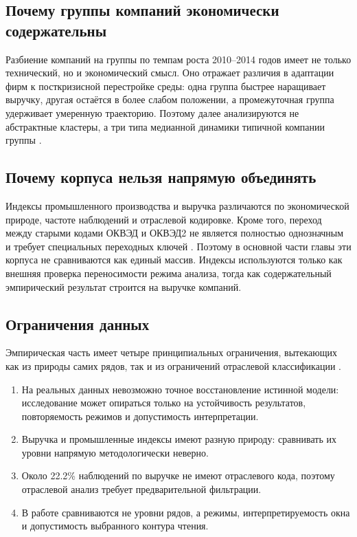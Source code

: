 \subsection{Почему группы компаний экономически содержательны}
\label{sec:pochemu-gruppy-kompanii-ekonomicheski-soderzhatelny}

Разбиение компаний на группы по темпам роста 2010--2014 годов имеет не только технический, но и экономический смысл. Оно отражает различия в адаптации фирм к посткризисной перестройке среды: одна группа быстрее наращивает выручку, другая остаётся в более слабом положении, а промежуточная группа удерживает умеренную траекторию. Поэтому далее анализируются не абстрактные кластеры, а три типа медианной динамики типичной компании группы \cite{coad,polunin-2019,polunin-yudanov-2020}.

\subsection{Почему корпуса нельзя напрямую объединять}
\label{sec:pochemu-korpusa-nelzya-napryamuyu-obedinyat}

Индексы промышленного производства и выручка различаются по экономической природе, частоте наблюдений и отраслевой кодировке. Кроме того, переход между старыми кодами ОКВЭД и ОКВЭД2 не является полностью однозначным и требует специальных переходных ключей \cite{minec-okved,rosstat-okved}. Поэтому в основной части главы эти корпуса не сравниваются как единый массив. Индексы используются только как внешняя проверка переносимости режима анализа, тогда как содержательный эмпирический результат строится на выручке компаний.

\subsection{Ограничения данных}
\label{sec:ogranicheniya-dannyh}

Эмпирическая часть имеет четыре принципиальных ограничения, вытекающих как из природы самих рядов, так и из ограничений отраслевой классификации \cite{minec-okved,rosstat-okved}.

\begin{enumerate}
\def\labelenumi{\arabic{enumi}.}
\tightlist
\item
  На реальных данных невозможно точное восстановление истинной модели: исследование может опираться только на устойчивость результатов, повторяемость режимов и допустимость интерпретации.
\item
  Выручка и промышленные индексы имеют разную природу: сравнивать их уровни напрямую методологически неверно.
\item
  Около 22.2\% наблюдений по выручке не имеют отраслевого кода, поэтому отраслевой анализ требует предварительной фильтрации.
\item
  В работе сравниваются не уровни рядов, а режимы, интерпретируемость окна и допустимость выбранного контура чтения.
\end{enumerate}

